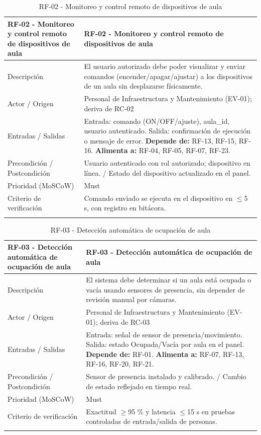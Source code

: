 \begingroup
\small
\begin{longtable}{|P{0.5000}|P{0.5000}|}
\hline
RF-02 - Monitoreo y control remoto de dispositivos de aula & RF-02 - Monitoreo y control remoto de dispositivos de aula \\ \hline
Descripción & El usuario autorizado debe poder visualizar y enviar comandos (encender/apagar/ajustar) a los dispositivos de un aula sin desplazarse físicamente. \\ \hline
Actor / Origen & Personal de Infraestructura y Mantenimiento (EV-01); deriva de RC-02 \\ \hline
Entradas / Salidas & Entrada: comando (ON/OFF/ajuste), aula\_id, usuario autenticado. Salida: confirmación de ejecución o mensaje de error. \textbf{Depende de:} RF-13, RF-15, RF-16. \textbf{Alimenta a:} RF-04, RF-05, RF-07, RF-23. \\ \hline
Precondición / Postcondición & Usuario autenticado con rol autorizado; dispositivo en línea. / Estado del dispositivo actualizado en el panel. \\ \hline
Prioridad (MoSCoW) & Must \\ \hline
Criterio de verificación & Comando enviado se ejecuta en el dispositivo en $\leq$5 s, con registro en bitácora. \\ \hline
\caption{RF-02 - Monitoreo y control remoto de dispositivos de aula}
\end{longtable}
\endgroup

\begingroup
\small
\begin{longtable}{|P{0.5000}|P{0.5000}|}
\hline
RF-03 - Detección automática de ocupación de aula & RF-03 - Detección automática de ocupación de aula \\ \hline
Descripción & El sistema debe determinar si un aula está ocupada o vacía usando sensores de presencia, sin depender de revisión manual por cámaras. \\ \hline
Actor / Origen & Personal de Infraestructura y Mantenimiento (EV-01); deriva de RC-03 \\ \hline
Entradas / Salidas & Entrada: señal de sensor de presencia/movimiento. Salida: estado Ocupada/Vacía por aula en el panel. \textbf{Depende de:} RF-01. \textbf{Alimenta a:} RF-07, RF-13, RF-16, RF-20, RF-21. \\ \hline
Precondición / Postcondición & Sensor de presencia instalado y calibrado. / Cambio de estado reflejado en tiempo real. \\ \hline
Prioridad (MoSCoW) & Must \\ \hline
Criterio de verificación & Exactitud $\geq$95 \% y latencia $\leq$15 s en pruebas controladas de entrada/salida de personas. \\ \hline
\caption{RF-03 - Detección automática de ocupación de aula}
\end{longtable}
\endgroup

